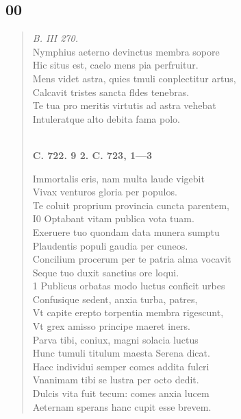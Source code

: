\documentclass[11pt, a4paper]{report}
\begin{document}
            \subsection*{00}
      \begin{verse}
      \textit{B. III 270.} \\ Nymphius aeterno devinctus membra sopore \\ Hic situs est, caelo mens pia perfruitur. \\ Mens videt astra, quies tmuli conplectitur artus, \\ Calcavit tristes sancta fldes tenebras. \\ Te tua pro meritis virtutis ad astra vehebat \\ Intuleratque alto debita fama polo. \\ 
        ﻿\pagebreak 
    \begin{center} \textbf{C. 722. 9 2. C. 723, 1—3} \end{center} \marginpar{[207]} Immortalis eris, nam multa laude vigebit \\ Vivax venturos gloria per populos. \\ Te coluit proprium provincia cuncta parentem, \\ I0 Optabant vitam publica vota tuam. \\ Exeruere tuo quondam data munera sumptu \\ Plaudentis populi gaudia per cuneos. \\ Concilium procerum per te patria alma vocavit \\ Seque tuo duxit sanctius ore loqui. \\ 1 Publicus orbatas modo luctus conficit urbes \\ Confusique sedent, anxia turba, patres, \\ Vt capite erepto torpentia membra rigescunt, \\ Vt grex amisso principe maeret iners. \\ Parva tibi, coniux, magni solacia luctus \\ Hunc tumuli titulum maesta Serena dicat. \\ Haec individui semper comes addita fulcri \\ Vnanimam tibi se lustra per octo dedit. \\ Dulcis vita fuit tecum: comes anxia lucem \\ Aeternam sperans hanc cupit esse brevem. \\ 
      \end{verse}
  
\end{document}
